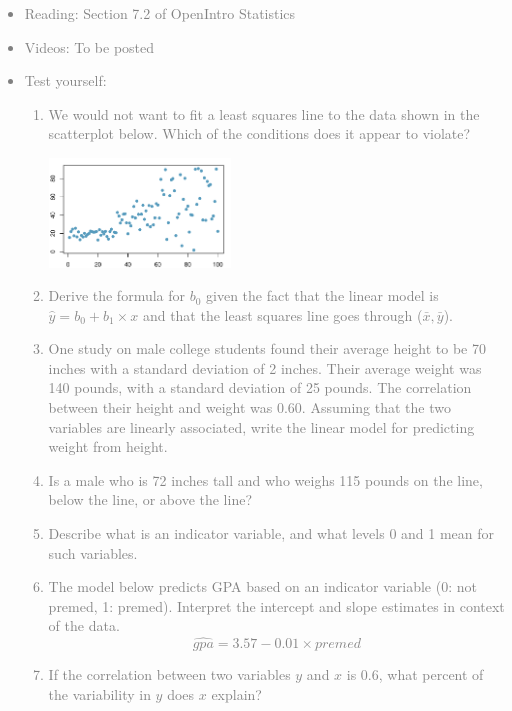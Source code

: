 \documentclass[11pt]{article}
\newcommand{\gray}[1]{\textcolor{gray}{#1}}
\begin{document}
\gray{
{\it
\vspace{-0.55cm}
\begin{itemize}
\renewcommand{\labelitemi}{{\textcolor{dark}{$\ast$}}}
\item Reading: Section 7.2 of OpenIntro Statistics
\item Videos: To be posted
\item Test yourself:
\begin{enumerate}
\item We would not want to fit a least squares line to the data shown in the scatterplot below. Which of the conditions does it appear to violate?
\begin{center}
\includegraphics[width=0.4\textwidth]{figures/nonconstant_var}
\end{center}
\item Derive the formula for $b_0$ given the fact that the linear model is $\hat{y} = b_0 + b_1 \times x$ and that the least squares line goes through ($\bar{x}, \bar{y}$).
\item One study on male college students found their average height to be 70 inches with a standard deviation of 2 inches. Their average weight was 140 pounds, with a standard deviation of 25 pounds. The correlation between their height and weight was 0.60. Assuming that the two variables are linearly associated, write the linear model for predicting weight from height.
\item Is a male who is 72 inches tall and who weighs 115 pounds on the line, below the line, or above the line?
\item Describe what is an indicator variable, and what levels 0 and 1 mean for such variables.
\item The model below predicts GPA based on an indicator variable (0: not premed, 1: premed). Interpret the intercept and slope estimates in context of the data.
\[ \widehat{gpa} = 3.57 - 0.01 \times premed \]
\item If the correlation between two variables $y$ and $x$ is 0.6, what percent of the variability in $y$ does $x$ explain? 
\end{enumerate}
\end{itemize}
}}
\end{document}
